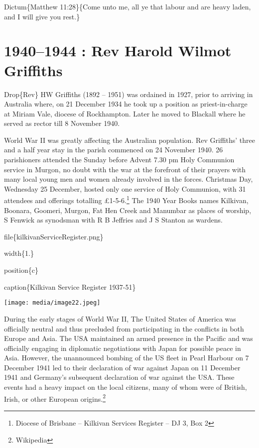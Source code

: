 Dictum\{Matthew 11:28\}\{Come unto me, all ye that labour and are heavy laden, and I will give you rest.\}

\hypertarget{rev-harold-wilmot-griffiths}{%
\chapter{1940--1944 : Rev Harold Wilmot Griffiths}\label{rev-harold-wilmot-griffiths}}

Drop\{Rev\} HW Griffiths (1892 -- 1951) was ordained in 1927, prior to arriving in Australia where, on 21 December 1934 he took up a position as priest-in-charge at Miriam Vale, diocese of Rockhampton. Later he moved to Blackall where he served as rector till 8 November 1940.

World War II was greatly affecting the Australian population. Rev Griffiths' three and a half year stay in the parish commenced on 24 November 1940. 26 parishioners attended the Sunday before Advent 7.30 pm Holy Communion service in Murgon, no doubt with the war at the forefront of their prayers with many local young men and women already involved in the forces. Christmas Day, Wednesday 25 December, hosted only one service of Holy Communion, with 31 attendees and offerings totalling £1-5-6.\footnote{Diocese of Brisbane -- Kilkivan Services Register -- DJ 3, Box 2} The 1940 Year Books names Kilkivan, Boonara, Goomeri, Murgon, Fat Hen Creek and Manumbar as places of worship, S Fenwick as synodsman with R B Jeffries and J S Stanton as wardens.

file\{kilkivanServiceRegister.png\}

width\{1.\}

position\{c\}

caption\{Kilkivan Service Register 1937-51\}

\texttt{[image: media/image22.jpeg]}

During the early stages of World War II, The United States of America was officially neutral and thus precluded from participating in the conflicts in both Europe and Asia. The USA maintained an armed presence in the Pacific and was officially engaging in diplomatic negotiations with Japan for possible peace in Asia. However, the unannounced bombing of the US fleet in Pearl Harbour on 7 December 1941 led to their declaration of war against Japan on 11 December 1941 and Germany's subsequent declaration of war against the USA. These events had a heavy impact on the local citizens, many of whom were of British, Irish, or other European origins.\footnote{Wikipedia}

